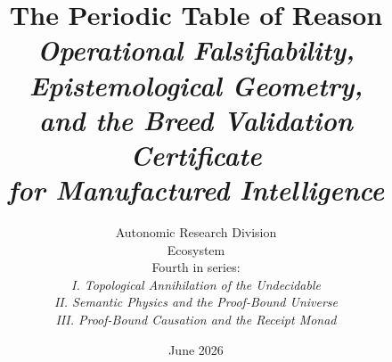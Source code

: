 \documentclass[12pt]{report}
\title{
  \LARGE\textbf{The Periodic Table of Reason}\\[1.2ex]
  \large\textit{Operational Falsifiability, Epistemological Geometry,\\
  and the Breed Validation Certificate\\
  for Manufactured Intelligence}
}
\author{
  Autonomic Research Division \\
  \wasm{} Ecosystem \\[0.8ex]
  \small Fourth in series: \\
  \small \textit{I. Topological Annihilation of the Undecidable} \\
  \small \textit{II. Semantic Physics and the Proof-Bound Universe} \\
  \small \textit{III. Proof-Bound Causation and the Receipt Monad}
}
\date{June 2026}
\theoremstyle{definition}
\theoremstyle{plain}
\theoremstyle{remark}
\begin{document}
\maketitle

\begin{abstract}

\end{abstract}

\tableofcontents



















\end{document}
